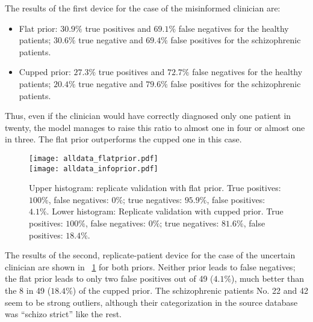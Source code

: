 The results of the first device for the case of the misinformed clinician
are:
\begin{itemize}
\item Flat prior: $30.9\%$ true positives and $69.1\%$ false negatives for
  the healthy patients; $30.6\%$ true negative and $69.4\%$ false positives
  for the schizophrenic patients.
\item Cupped prior: $27.3\%$ true positives and $72.7\%$ false
  negatives for the healthy patients; $20.4\%$ true negative and $79.6\%$
  false positives for the schizophrenic patients.
\end{itemize}
Thus, even if the clinician would have correctly diagnosed only one patient
in twenty, the model manages to raise this ratio to almost one in four or
almost one in three. The flat prior outperforms the cupped one in this
case.
% 
% 

\begin{figure}[!h]
  \centering
\texttt{[image: alldata\_flatprior.pdf]}\\
\texttt{[image: alldata\_infoprior.pdf]}%
\caption{Upper histogram: replicate validation with flat prior. True positives: $100\%$,
false negatives: $0\%$; true negatives: $95.9\%$, false positives: $4.1\%$.
Lower histogram: Replicate validation with cupped prior. True positives: $100\%$,
false negatives: $0\%$; true negatives: $81.6\%$, false positives: $18.4\%$.}
\label{fig:allval_flatprior}
\end{figure}
The results of the second, replicate-patient device for the case of the
uncertain clinician are shown in \fig~\ref{fig:allval_flatprior} for both
priors. Neither prior leads to false negatives; the flat prior leads to only
two false positives out of 49 ($4.1\%$), much better than the 8 in 49
($18.4\%$) of the cupped prior. The schizophrenic patients No. 22 and
42 seem to be strong outliers, although their categorization in the source
database was \enquote{schizo strict} like the rest.

